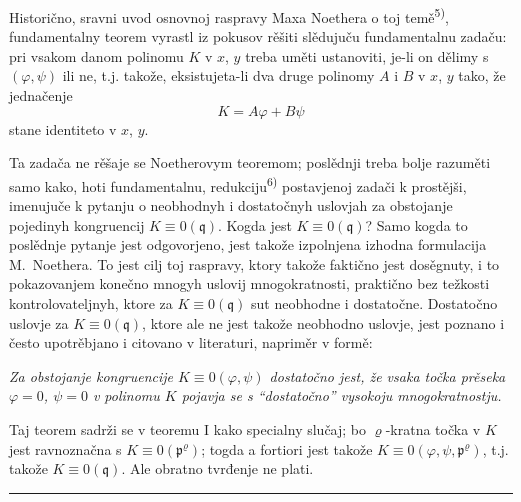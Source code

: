 \documentclass[11pt]{article}
\theoremstyle{plain}
\begin{document}
Historično, sravni uvod osnovnoj raspravy Maxa Noethera o toj
temě\textsuperscript{5)}, fundamentalny teorem vyrastl iz pokusov
rěšiti slědujuču fundamentalnu zadaču: pri vsakom danom polinomu
$K$ v $x$, $y$ treba uměti ustanoviti, je-li on dělimy s
$(\varphi, \psi)$ ili ne, t.j. takože, eksistujeta-li dva druge
polinomy $A$ i $B$ v $x$, $y$ tako, že jednačenje
\[
K = A\varphi + B\psi
\]
stane identiteto v $x$, $y$.

Ta zadača ne rěšaje se Noetherovym teoremom; poslědnji treba bolje
razuměti samo kako, hoti fundamentalnu, redukciju\textsuperscript{6)}
postavjenoj zadači k prostějši, imenujuče k pytanju o neobhodnyh i
dostatočnyh uslovjah za obstojanje pojedinyh kongruencij
$K \equiv 0(\mathfrak{q})$. Kogda jest $K \equiv 0(\mathfrak{q})$?
Samo kogda to poslědnje pytanje jest odgovorjeno, jest takože
izpolnjena izhodna formulacija M.\ Noethera. To jest cilj toj
raspravy, ktory takože faktično jest dosěgnuty, i to pokazovanjem
konečno mnogyh uslovij mnogokratnosti, praktično bez težkosti
kontrolovateljnyh, ktore za $K \equiv 0(\mathfrak{q})$ sut
neobhodne i dostatočne. Dostatočno uslovje za
$K \equiv 0(\mathfrak{q})$, ktore ale ne jest takože neobhodno
uslovje, jest poznano i često upotrěbjano i citovano v literaturi,
napriměr v formě:

\smallskip
\textit{Za obstojanje kongruencije $K \equiv 0(\varphi, \psi)$
dostatočno jest, že vsaka točka prěseka $\varphi = 0$, $\psi = 0$
v polinomu $K$ pojavja se s ``dostatočno'' vysokoju mnogokratnostju.}

\smallskip
Taj teorem sadrži se v teoremu I kako specialny slučaj; bo
$\varrho$-kratna točka v $K$ jest ravnoznačna s
$K \equiv 0(\mathfrak{p}^{\varrho})$; togda a fortiori jest takože
$K \equiv 0(\varphi, \psi, \mathfrak{p}^{\varrho})$, t.j. takože
$K \equiv 0(\mathfrak{q})$. Ale obratno tvrđenje ne plati.

\vspace{0.5em}
\noindent\rule{\textwidth}{0.4pt}
\vspace{0.3em}
\end{document}

